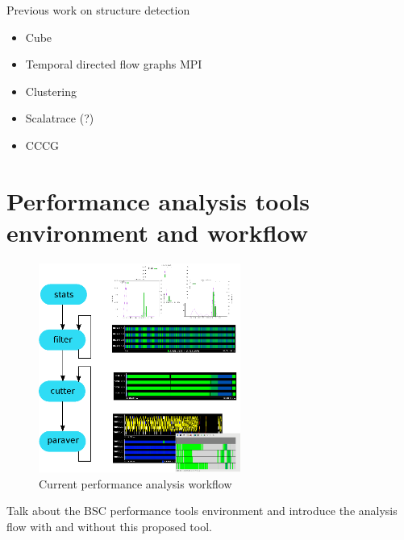 \documentclass[12pt]{report}
\begin{document}
Previous work on structure detection
\begin{itemize}
  \item Cube
  \item Temporal directed flow graphs MPI
  \item Clustering
  \item Scalatrace (?)
  \item CCCG
\end{itemize}

\section{Performance analysis tools environment and workflow}\label{s:pt_evironment}

\begin{figure}
  \caption{Current performance analysis workflow}
  \label{currentAnalysisFlow}
  \centering
    \includegraphics[width=250px]{current_analysis_flow.eps}
\end{figure}


Talk about the BSC performance tools environment and introduce the analysis flow
with and without this proposed tool.





\end{document}
